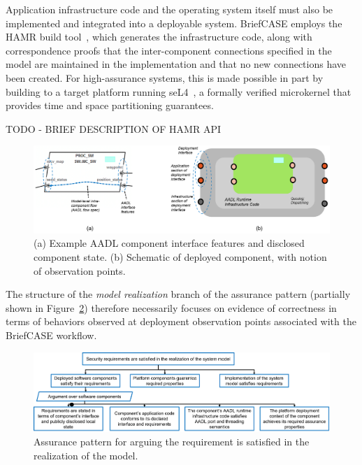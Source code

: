 Application infrastructure code and the operating system itself must also be implemented and integrated into a deployable system.  BriefCASE employs the HAMR build tool~\cite{hamr}, which generates the infrastructure code, along with correspondence proofs that the inter-component connections specified in the model are maintained in the implementation and that no new connections have been created.  For high-assurance systems, this is made possible in part by building to a target platform running seL4~\cite{sel4-cacm18}, a formally verified microkernel that provides time and space partitioning guarantees.

TODO - BRIEF DESCRIPTION OF HAMR API

\begin{figure}[h] 
	\centering 
	\includegraphics[width=\textwidth]{figs/deployment-interface.png}
	\caption{(a) Example AADL component interface features and disclosed component state. (b) Schematic of deployed component, with notion of observation points.}
	\label{fig:deployment-interface} 
\end{figure}

The structure of the \textit{model realization} branch of the assurance pattern (partially shown in Figure~\ref{fig:req-satisfied-in-model-realization}) therefore necessarily focuses on evidence of correctness in terms of behaviors observed at deployment observation points associated with the BriefCASE workflow.  


\begin{figure}[h] 
	\centering 
	\includegraphics[width=\textwidth]{figs/req-satisfied-in-model-realization.png}
	\caption{Assurance pattern for arguing the requirement is satisfied in the realization of the model.}
	\label{fig:req-satisfied-in-model-realization} 
\end{figure}

